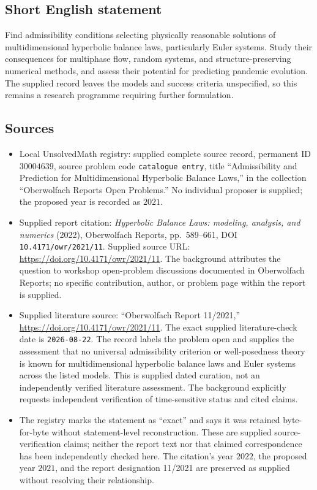 \documentclass[11pt]{article}
\begin{document}
\subsection{Short English statement}
Find admissibility conditions selecting physically reasonable solutions of multidimensional hyperbolic balance laws, particularly Euler systems. Study their consequences for multiphase flow, random systems, and structure-preserving numerical methods, and assess their potential for predicting pandemic evolution. The supplied record leaves the models and success criteria unspecified, so this remains a research programme requiring further formulation.
\subsection{Sources}
\begin{itemize}
\item Local UnsolvedMath registry: supplied complete source record, permanent ID \(30004639\), source problem code \texttt{catalogue entry}, title ``Admissibility and Prediction for Multidimensional Hyperbolic Balance Laws,'' in the collection ``Oberwolfach Reports Open Problems.'' No individual proposer is supplied; the proposed year is recorded as \(2021\).
\item Supplied report citation: \emph{Hyperbolic Balance Laws: modeling, analysis, and numerics} (2022), Oberwolfach Reports, pp.\ 589--661, DOI \texttt{10.4171/owr/2021/11}. Supplied source URL: \url{https://doi.org/10.4171/owr/2021/11}. The background attributes the question to workshop open-problem discussions documented in Oberwolfach Reports; no specific contribution, author, or problem page within the report is supplied.
\item Supplied literature source: ``Oberwolfach Report 11/2021,'' \url{https://doi.org/10.4171/owr/2021/11}. The exact supplied literature-check date is \texttt{2026-08-22}. The record labels the problem open and supplies the assessment that no universal admissibility criterion or well-posedness theory is known for multidimensional hyperbolic balance laws and Euler systems across the listed models. This is supplied dated curation, not an independently verified literature assessment. The background explicitly requests independent verification of time-sensitive status and cited claims.
\item The registry marks the statement as ``exact'' and says it was retained byte-for-byte without statement-level reconstruction. These are supplied source-verification claims; neither the report text nor that claimed correspondence has been independently checked here. The citation's year \(2022\), the proposed year \(2021\), and the report designation 11/2021 are preserved as supplied without resolving their relationship.
\end{itemize}
\end{document}
